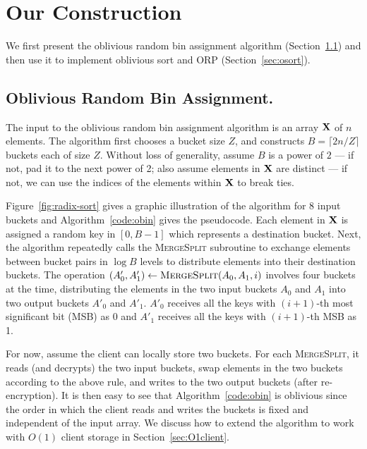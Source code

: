 



\section{Our Construction} 
\label{sec:random-bin-assignment}

We first present the oblivious random bin assignment algorithm (Section~\ref{sec:obin})  and then use it to implement oblivious sort and ORP (Section~\ref{sec:osort}).

\newcommand{\val}{{\sf value}}
\newcommand{\pref}{{\sf pref}}

\subsection{Oblivious Random Bin Assignment.}
\label{sec:obin}

The input to the oblivious random bin assignment algorithm is an array $\mathbf{X}$ of $n$ elements. 
The algorithm first chooses a bucket size $Z$, 
and constructs $B=\lceil 2n/Z \rceil$ buckets each of size $Z$.
Without loss of generality, assume $B$ is a power of $2$ --- if not, pad it to the next power of 2;
also assume elements in $\mathbf{X}$ are distinct --- if not, we can use the indices of the elements within $\mathbf{X}$ to break ties.

Figure~\ref{fig:radix-sort} gives a graphic illustration of the algorithm for 8 input buckets and Algorithm~\ref{code:obin} gives the pseudocode.
Each element in $\mathbf{X}$ is assigned a random key in $[0, B-1]$ which represents a destination bucket.
Next, the algorithm repeatedly calls the \textsc{MergeSplit} subroutine to exchange elements between bucket pairs in $\log B$ levels to distribute elements into their destination buckets. 
The operation $(A'_0,A'_1)\leftarrow \textsc{MergeSplit}(A_0,A_1,i)$ involves four buckets at the time, distributing the elements in the two input buckets $A_0$ and $A_1$ into two output buckets $A'_0$ and $A'_1$.
$A'_0$ receives all the keys with $(i+1)$-th most significant bit (MSB) as 0 and $A'_1$ receives all the keys with $(i+1)$-th MSB as 1.




For now, assume the client can locally store two buckets.
For each \textsc{MergeSplit}, it reads (and decrypts) the two input buckets, swap elements in the two buckets according to the above rule, and writes to the two output buckets (after re-encryption).
It is then easy to see that Algorithm~\ref{code:obin} is oblivious since the order in which the client reads and writes the buckets is fixed and independent of the input array.
We discuss how to extend the algorithm to work with $O(1)$ client storage in Section~\ref{sec:O1client}. 

